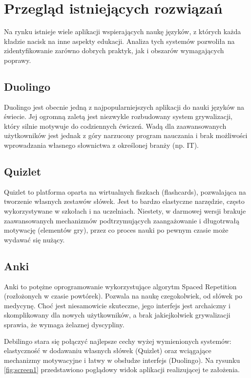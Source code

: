 \documentclass[times]{san}
\begin{document}
\section{Przegląd istniejących rozwiązań}

Na rynku istnieje wiele aplikacji wspierających naukę języków, z których każda kładzie nacisk na inne aspekty edukacji. Analiza tych systemów pozwoliła na zidentyfikowanie zarówno dobrych praktyk, jak i obszarów wymagających poprawy.

\subsection{Duolingo}
Duolingo jest obecnie jedną z najpopularniejszych aplikacji do nauki języków na świecie. Jej ogromną zaletą jest niezwykle rozbudowany system grywalizacji, który silnie motywuje do codziennych ćwiczeń. Wadą dla zaawansowanych użytkowników jest jednak z góry narzucony program nauczania i brak możliwości wprowadzania własnego słownictwa z określonej branży (np. IT).

\subsection{Quizlet}
Quizlet to platforma oparta na wirtualnych fiszkach (flashcards), pozwalająca na tworzenie własnych zestawów słówek. Jest to bardzo elastyczne narzędzie, często wykorzystywane w szkołach i na uczelniach. Niestety, w darmowej wersji brakuje zaawansowanych mechanizmów podtrzymujących zaangażowanie i długotrwałą motywację (elementów gry), przez co proces nauki po pewnym czasie może wydawać się nużący.

\subsection{Anki}
Anki to potężne oprogramowanie wykorzystujące algorytm Spaced Repetition (rozłożonych w czasie powtórek). Pozwala na naukę czegokolwiek, od słówek po medycynę. Choć jest niesamowicie skuteczne, jego interfejs jest archaiczny i skomplikowany dla nowych użytkowników, a brak jakiejkolwiek grywalizacji sprawia, że wymaga żelaznej dyscypliny.

\vspace{0.5cm}
Debilingo stara się połączyć najlepsze cechy wyżej wymienionych systemów: elastyczność w dodawaniu własnych słówek (Quizlet) oraz wciągające mechanizmy motywacyjne i łatwy w obsłudze interfejs (Duolingo). Na rysunku \ref{fig:screen1} przedstawiono poglądowy widok aplikacji realizującej te założenia.
\end{document}
